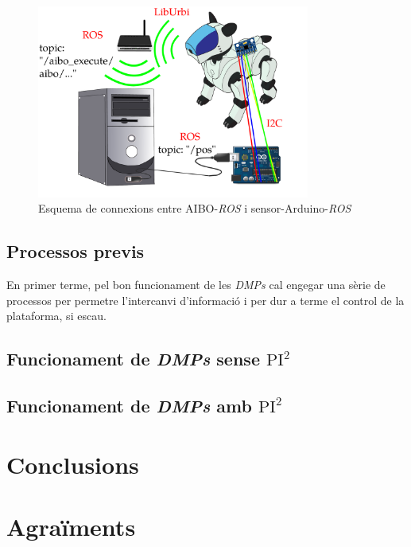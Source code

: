 \documentclass[12pt,a4paper,final,twoside]{article}
\begin{document}
\begin{figure}[tb]
\centering
\includegraphics[width=0.8\textwidth]{Imatges/esquema-comunicacio-ROS-Aibo-ordenadora.pdf}
\caption{Esquema de connexions entre AIBO-\textit{ROS} i sensor-Arduino-\textit{ROS}}
\label{fig:connexions-Aibo-ROS-sensor-Arduino-ROS}
\end{figure}



\subsection{Processos previs}

En primer terme, pel bon funcionament de les \textit{DMPs} cal engegar una sèrie de processos per permetre l'intercanvi d'informació i per dur a terme el control de la plataforma, si escau.


\subsection{Funcionament de \textit{DMPs} sense $\mathrm{PI^2}$}
\subsection{Funcionament de \textit{DMPs} amb $\mathrm{PI^2}$}


\newpage
\section{Conclusions}

\newpage
\section*{Agraïments}
\end{document}
